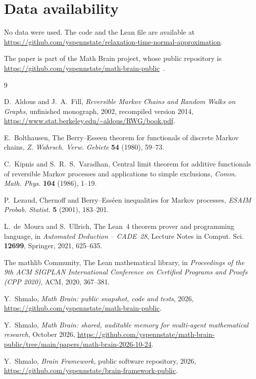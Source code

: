 \documentclass[11pt]{amsart}
\theoremstyle{remark}
\numberwithin{equation}{section}
\begin{document}
\section*{Data availability}
No data were used. The code and the Lean file are available at\\ \url{https://github.com/yspennstate/relaxation-time-normal-approximation}.

The paper is part of the Math Brain project, whose public repository is \url{https://github.com/yspennstate/math-brain-public}~\cite{MathBrainRepo}.

\begin{thebibliography}{9}

D.~Aldous and J.~A.~Fill, \emph{Reversible Markov Chains and Random Walks on Graphs}, unfinished monograph, 2002, recompiled version 2014, \url{https://www.stat.berkeley.edu/~aldous/RWG/book.pdf}.

E.~Bolthausen, The Berry--Esseen theorem for functionals of discrete Markov chains, \emph{Z. Wahrsch. Verw. Gebiete} \textbf{54} (1980), 59--73.

C.~Kipnis and S.~R.~S.~Varadhan, Central limit theorem for additive functionals of reversible Markov processes and applications to simple exclusions, \emph{Comm. Math. Phys.} \textbf{104} (1986), 1--19.

P.~Lezaud, Chernoff and Berry--Ess\'een inequalities for Markov processes, \emph{ESAIM Probab. Statist.} \textbf{5} (2001), 183--201.

L.~de~Moura and S.~Ullrich, The Lean~4 theorem prover and programming language, in \emph{Automated Deduction -- CADE~28}, Lecture Notes in Comput. Sci. \textbf{12699}, Springer, 2021, 625--635.

The mathlib Community, The Lean mathematical library, in \emph{Proceedings of the 9th ACM SIGPLAN International Conference on Certified Programs and Proofs (CPP 2020)}, ACM, 2020, 367--381.

 Y.~Shmalo, \emph{Math Brain: public snapshot, code and tests}, 2026, \url{https://github.com/yspennstate/math-brain-public}.

 Y.~Shmalo, \emph{Math Brain: shared, auditable memory for multi-agent mathematical research}, October 2026, \url{https://github.com/yspennstate/math-brain-public/tree/main/papers/math-brain-2026-10-24}.

 Y.~Shmalo, \emph{Brain Framework}, public software repository, 2026, \url{https://github.com/yspennstate/brain-framework-public}.

\end{thebibliography}
\end{document}
